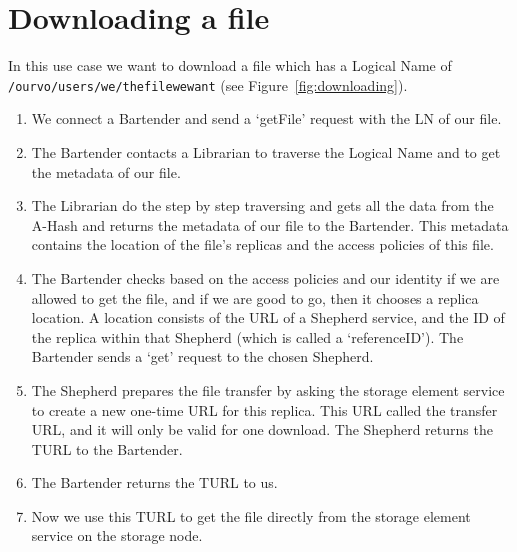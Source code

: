 \documentclass{book}
\begin{document}

\section{Downloading a file} %
\label{sec:downloading_a_file}
\begin{figure}[ht]
\end{figure}

In this use case we want to download a file which has a Logical Name of \verb#/ourvo/users/we/thefilewewant# (see Figure~\ref{fig:downloading}).

\begin{enumerate}
    \item We connect a Bartender and send a `getFile' request with the LN of our file.
    \item The Bartender contacts a Librarian to traverse the Logical Name and to get the metadata of our file.
    \item The Librarian do the step by step traversing and gets all the data from the A-Hash and returns the metadata of our file to the Bartender. This metadata contains the location of the file's replicas and the access policies of this file.
    \item The Bartender checks based on the access policies and our identity if we are allowed to get the file, and if we are good to go, then it chooses a replica location. A location consists of the URL of a Shepherd service, and the ID of the replica within that Shepherd (which is called a `referenceID'). The Bartender sends a `get' request to the chosen Shepherd.
    \item The Shepherd prepares the file transfer by asking the storage element service to create a new one-time URL for this replica. This URL called the transfer URL, and it will only be valid for one download. The Shepherd returns the TURL to the Bartender.
    \item The Bartender returns the TURL to us.
    \item Now we use this TURL to get the file directly from the storage element service on the storage node.
\end{enumerate}
\end{document}
